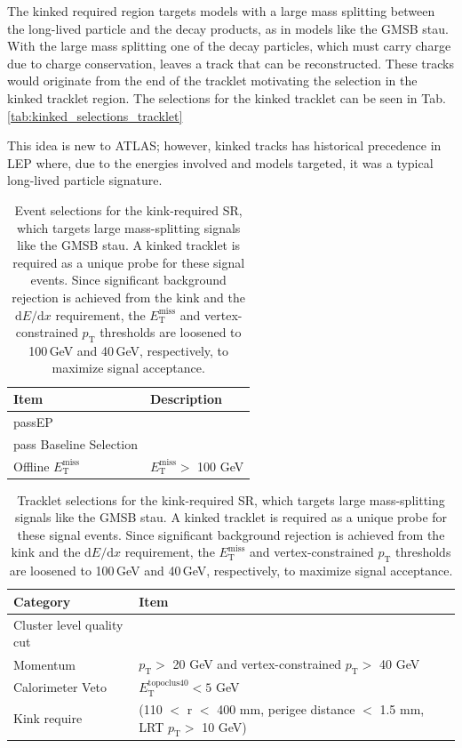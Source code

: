 The kinked required region targets models with a large mass splitting between the long-lived particle and the decay products, as in models like the GMSB stau. With the large mass splitting one of the decay particles, which must carry charge due to charge conservation, leaves a track that can be reconstructed. These tracks would originate from the end of the tracklet motivating the selection in the kinked tracklet region. 
The selections for the kinked tracklet can be seen in Tab. \ref{tab:kinked_selections_tracklet}

This idea is new to ATLAS; however, kinked tracks has historical precedence in LEP where, due to the energies involved and models targeted, it was a typical long-lived particle signature. 


\begin{table}[h!]
\centering
\begin{tabular}{l|l}
\hline
\hline
\textbf{Item} & \textbf{Description}  \\
\hline
\hline
passEP       &   \\
pass Baseline Selection&   \\
Offline $E_{\mathrm{T}}^{\mathrm{miss}}$               &  $E_{\mathrm{T}}^{\mathrm{miss}} > $ 100 GeV  \\
\end{tabular}
\caption{Event selections for the kink-required SR, which targets large mass-splitting signals like the GMSB stau. A kinked tracklet is required as a unique probe for these signal events. Since significant background rejection is achieved from the kink and the $\text{d}E/\text{d}x$ requirement, the $E_{\mathrm{T}}^{\mathrm{miss}}$ and vertex-constrained $p_{\mathrm{T}}$ thresholds are loosened to 100\,GeV and 40\,GeV, respectively, to maximize signal acceptance.}
\label{tab:kink_require_sr_event}
\end{table}


\begin{table}[h!]
    \small

\centering
\begin{tabular}{l|l}
\hline
\hline
\textbf {Category} &  \textbf{Item}  \\
\hline
\hline
Cluster level quality cut& \\ 
Momentum &  $p_{\mathrm{T}} >$ 20 GeV and vertex-constrained $p_{\mathrm{T}} >$ 40 GeV  \\
Calorimeter Veto & $E_{\mathrm{T}}^{\mathrm{topoclus} 40 } < 5 $ GeV \\
Kink require& (110 $<$ r $<$ 400 mm, perigee distance $<$ 1.5 mm, LRT $p_{\mathrm{T}} >$ 10 GeV) \\
\hline
\end{tabular}
\caption{Tracklet selections for the kink-required SR, which targets large mass-splitting signals like the GMSB stau. A kinked tracklet is required as a unique probe for these signal events. Since significant background rejection is achieved from the kink and the $\text{d}E/\text{d}x$ requirement, the $E_{\mathrm{T}}^{\mathrm{miss}}$ and vertex-constrained $p_{\mathrm{T}}$ thresholds are loosened to 100\,GeV and 40\,GeV, respectively, to maximize signal acceptance.}
\label{tab:kink_require_sr}
\end{table}


